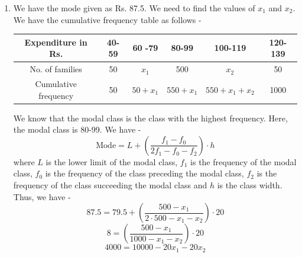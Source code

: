 \begin{enumerate}
\begin{enumerate}
\begin{center}
    \end{center}
    We know that the median class is the class where the cumulative frequency is greater than or equal to $\frac{N}{2}$. Here, $N = 1000$. Thus, we have -
    \[\frac{N}{2} = 500\]   
    Thus, the median class is 80-99. We have -
    \[\text{Median} = L + \left(\frac{\frac{N}{2} - F}{f_m}\right) \cdot h\]
    where $L$ is the lower limit of the median class, $N$ is the total number of observations, $F$ is the cumulative frequency of the class preceding the median class, $f_m$ is the frequency of the median class and $h$ is the class width. Thus, we have -
    \[87.5 = 79.5 + \left(\frac{500 - (50 + x_1)}{500}\right) \cdot 20\]
    \[8 = \left(\frac{450 - x_1}{500}\right) \cdot 20\]
    \[2000 = 9000 - 20 x_1\]
    \[20 x_1 = 7000\]
    \[x_1 = 350 \quad \ldots (1)\]
    We also have the total number of families as 1000. Thus, we have -
    \[50 + x_1 + 500 + x_2 + 50 = 1000\]
    \[x_1 + x_2 = 400 \quad \ldots (2)\]
    Solving equations (1) and (2), we get -
    \[x_1 = 350, \quad x_2 = 50\]
    \[\boxed{(x_1, x_2) = (350, 50)
    }\]
    \item We have the mode given as Rs. 87.5. We need to find the values of $x_1$ and $x_2$. We have the cumulative frequency table as follows -
    \begin{center}
        \begin{tabular}{|c|ccccc|}
            \hline
            Expenditure in Rs. & 40-59 & 60 -79 & 80-99 & 100-119 & 120-139 \\
            \hline
            No. of families & 50 & $x_1$ & 500 & $x_2$ & 50 \\
            Cumulative frequency & 50 & $50 + x_1$ & $550 + x_1$ & $550 + x_1 + x_2$ & 1000 \\
            \hline
        \end{tabular}
    \end{center}
    We know that the modal class is the class with the highest frequency. Here, the modal class is 80-99. We have -
    \[\text{Mode} = L + \left(\frac{f_1 - f_0}{2f_1 - f_0 - f_2}\right) \cdot h\]
    where $L$ is the lower limit of the modal class, $f_1$ is the frequency of the modal class, $f_0$ is the frequency of the class preceding the modal class, $f_2$ is the frequency of the class succeeding the modal class and $h$ is the class width. Thus, we have -
    \[87.5 = 79.5 + \left(\frac{500 - x_1}{2 \cdot 500 - x_1 - x_2}\right) \cdot 20\]
    \[8 = \left(\frac{500 - x_1}{1000 - x_1 - x_2}\right) \cdot 20\]
    \[4000 = 10000 - 20 x_1 - 20 x_2\]

\end{enumerate}
\end{enumerate}
